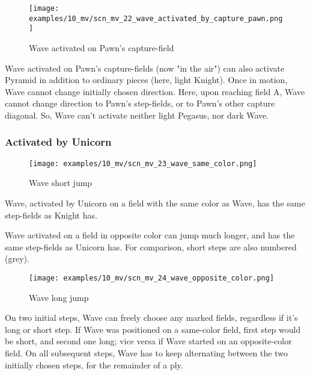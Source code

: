 \clearpage %

\vspace*{-2.1\baselineskip}
\noindent
\begin{figure}[!h]
\texttt{[image: examples/10\_mv/scn\_mv\_22\_wave\_activated\_by\_capture\_pawn.png]}
\caption{Wave activated on Pawn's capture-field}
\label{fig:scn_mv_22_wave_activated_by_capture_pawn}
\end{figure}

Wave activated on Pawn's capture-fields (now "in the air") can also activate Pyramid
in addition to ordinary pieces (here, light Knight). Once in motion, Wave cannot
change initially chosen direction. Here, upon reaching field A, Wave cannot change
direction to Pawn's step-fields, or to Pawn's other capture diagonal. So, Wave can't
activate neither light Pegasus, nor dark Wave.

\clearpage %

\subsubsection*{Activated by Unicorn}
\label{sec:Miranda's veil/Wave/Movement/Activated by Unicorn}

\vspace*{-0.7\baselineskip}
\noindent
\begin{wrapfigure}[10]{l}{0.45\textwidth}
\centering
\texttt{[image: examples/10\_mv/scn\_mv\_23\_wave\_same\_color.png]}
\vspace*{-0.3\baselineskip}
\caption{Wave short jump}
\label{fig:scn_mv_23_wave_same_color}
\end{wrapfigure}
Wave, activated by Unicorn on a field with the same color as Wave, has the same step-fields
as Knight has.

Wave activated on a field in opposite color can jump much longer, and has the same step-fields
as Unicorn has. For comparison, short steps are also numbered (grey).

\vspace*{0.7\baselineskip}
\noindent
\begin{wrapfigure}[18]{l}{0.7\textwidth}
\centering
\texttt{[image: examples/10\_mv/scn\_mv\_24\_wave\_opposite\_color.png]}
\vspace*{-0.3\baselineskip}
\caption{Wave long jump}
\label{fig:scn_mv_24_wave_opposite_color}
\end{wrapfigure}
On two initial steps, Wave can freely choose any marked fields, regardless if it's long or short step.
If Wave was positioned on a same-color field, first step would be short, and second one long; vice versa
if Wave started on an opposite-color field. On all subsequent steps, Wave has to keep alternating between
the two initially chosen steps, for the remainder of a ply.

